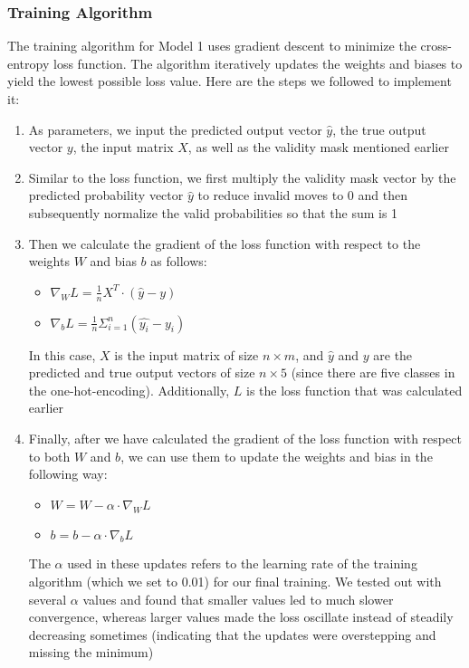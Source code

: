 \documentclass[11pt]{article}
\begin{document}
\subsubsection{Training Algorithm}

The training algorithm for Model 1 uses gradient descent to minimize the cross-entropy loss function. The algorithm iteratively updates the weights and biases to yield the lowest possible loss value. Here are the steps we followed to implement it:

\begin{enumerate}
    \item As parameters, we input the predicted output vector $\hat{y}$, the true output vector $y$, the input matrix $X$, as well as the validity mask mentioned earlier
    \item Similar to the loss function, we first multiply the validity mask vector by the predicted probability vector $\hat{y}$ to reduce invalid moves to 0 and then subsequently normalize the valid probabilities so that the sum is 1
    \item Then we calculate the gradient of the loss function with respect to the weights $W$ and bias $b$ as follows:
    \begin{itemize}
        \item $\nabla_{W} L = \frac{1}{n} X^{T} \cdot (\hat{y} - y)$
        \item $\nabla_{b} L = \frac{1}{n} \Sigma_{i=1}^{n} (\hat{y_i} - y_i)$
    \end{itemize}
    In this case, $X$ is the input matrix of size $n \times m$, and $\hat{y}$ and $y$ are the predicted and true output vectors of size $n \times 5$ (since there are five classes in the one-hot-encoding). Additionally, $L$ is the loss function that was calculated earlier
    \item Finally, after we have calculated the gradient of the loss function with respect to both $W$ and $b$, we can use them to update the weights and bias in the following way:
    \begin{itemize}
        \item $W = W - \alpha \cdot \nabla_{W} L$
        \item $b = b - \alpha \cdot \nabla_{b} L$
    \end{itemize}
    The $\alpha$ used in these updates refers to the learning rate of the training algorithm (which we set to 0.01) for our final training. We tested out with several $\alpha$ values and found that smaller values led to much slower convergence, whereas larger values made the loss oscillate instead of steadily decreasing sometimes (indicating that the updates were overstepping and missing the minimum)

\end{enumerate}
\end{document}
